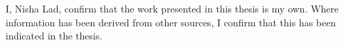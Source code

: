 I, Nisha Lad, confirm that the work presented in this thesis is my own. Where information has been derived from other sources, I confirm that this has been indicated in the thesis.